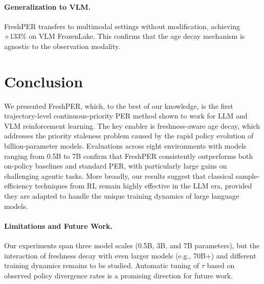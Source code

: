 \documentclass[runningheads]{llncs}
\newcommand{\method}{FreshPER}
\begin{document}
\paragraph{Generalization to VLM.}
\method{} transfers to multimodal settings without modification, achieving +133\% on VLM FrozenLake. This confirms that the age decay mechanism is agnostic to the observation modality.




\section{Conclusion}
\label{sec:conclusion}

We presented \method{}, which, to the best of our knowledge, is the first trajectory-level continuous-priority PER method shown to work for LLM and VLM reinforcement learning. The key enabler is freshness-aware age decay, which addresses the priority staleness problem caused by the rapid policy evolution of billion-parameter models. Evaluations across eight environments with models ranging from 0.5B to 7B confirm that \method{} consistently outperforms both on-policy baselines and standard PER, with particularly large gains on challenging agentic tasks. More broadly, our results suggest that classical sample-efficiency techniques from RL remain highly effective in the LLM era, provided they are adapted to handle the unique training dynamics of large language models.


\paragraph{Limitations and Future Work.}
Our experiments span three model scales (0.5B, 3B, and 7B parameters), but the interaction of freshness decay with even larger models (e.g., 70B+) and different training dynamics remains to be studied. Automatic tuning of $\tau$ based on observed policy divergence rates is a promising direction for future work.

\clearpage


\end{document}
